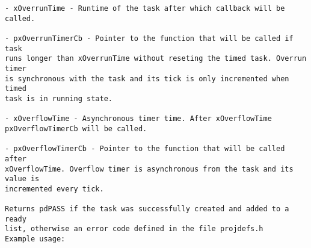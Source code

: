 \begin{lstlisting}
- xOverrunTime - Runtime of the task after which callback will be called.

- pxOverrunTimerCb - Pointer to the function that will be called if task
runs longer than xOverrunTime without reseting the timed task. Overrun timer
is synchronous with the task and its tick is only incremented when timed
task is in running state.

- xOverflowTime - Asynchronous timer time. After xOverflowTime
pxOverflowTimerCb will be called.

- pxOverflowTimerCb - Pointer to the function that will be called after
xOverflowTime. Overflow timer is asynchronous from the task and its value is
incremented every tick.

Returns pdPASS if the task was successfully created and added to a ready
list, otherwise an error code defined in the file projdefs.h
Example usage:

\end{lstlisting}

